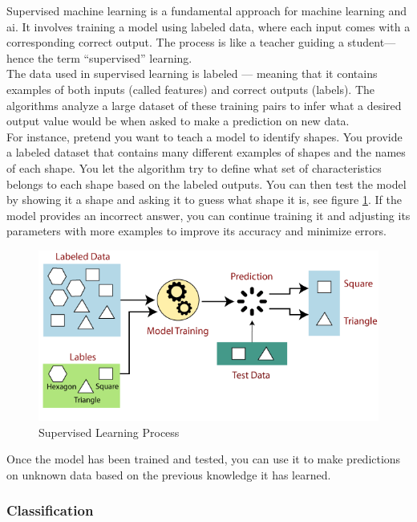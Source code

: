 Supervised machine learning is a fundamental approach for machine learning and \gls{ai}. It involves training a model using labeled data, where each input comes with a corresponding correct output. The process is like a teacher guiding a student—hence the term “supervised” learning. \cite{geeksforgeeks:supervised-learning} \\

The data used in supervised learning is labeled — meaning that it contains examples of both inputs (called features) and correct outputs (labels). The algorithms analyze a large dataset of these training pairs to infer what a desired output value would be when asked to make a prediction on new data. \cite{google:supervised-learning} \\

For instance, pretend you want to teach a model to identify shapes. You provide a labeled dataset that contains many different examples of shapes and the names of each shape. You let the algorithm try to define what set of characteristics belongs to each shape based on the labeled outputs. You can then test the model by showing it a shape and asking it to guess what shape it is, see figure \ref{fig:supervised-learning}. If the model provides an incorrect answer, you can continue training it and adjusting its parameters with more examples to improve its accuracy and minimize errors. \cite{google:supervised-learning} \\ 

\begin{figure}[h!]
    \centering
    \includegraphics[width=0.75\linewidth]{figures/theory/supervised-learning.png}
    \caption{Supervised Learning Process}
    \label{fig:supervised-learning}
\end{figure}

Once the model has been trained and tested, you can use it to make predictions on unknown data based on the previous knowledge it has learned. \cite{google:supervised-learning}

\subsubsection*{Classification}

